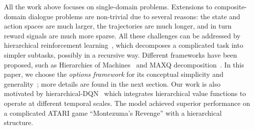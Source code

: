 \documentclass[11pt,letterpaper]{article}
\begin{document}
	
All the work above focuses on single-domain problems. Extensions to composite-domain dialogue problems are non-trivial due to several reasons: the state and action spaces are much larger, the trajectories are much longer, and in turn reward signals are much more sparse.
All these challenges 
can be addressed by hierarchical reinforcement learning~\cite{DBLP:journals/ai/SuttonPS99,DBLP:conf/icml/SuttonPS98,DBLP:conf/aaai/Singh92,DBLP:journals/jair/Dietterich00,DBLP:journals/deds/BartoM03}, which decomposes a complicated task into simpler subtasks, possibly in a recursive way.  Different frameworks have been proposed, such as Hierarchies of Machines~\cite{DBLP:conf/nips/ParrR97} and MAXQ decomposition~\cite{DBLP:journals/jair/Dietterich00}.  In this paper, we choose the \emph{options framework} for its conceptual simplicity and generality~\cite{DBLP:conf/icml/SuttonPS98}; more details are found in the next section.  Our work is also motivated by hierarchical-DQN~\cite{DBLP:conf/nips/KulkarniNST16} which integrates hierarchical value functions to operate at different temporal scales. The model achieved superior performance on a complicated ATARI game ``Montezuma's Revenge'' with a hierarchical structure.
\end{document}
